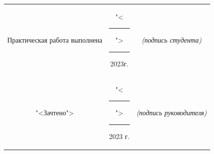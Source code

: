 \begin{titlepage}
\begin{center}
		\vfill

		\begin{footnotesize}
			\begin{tabular}{ccc}
				Практическая  работа выполнена
				& "<\rule{1ex}{.5pt}">\rule{7ex}{.5pt}2023г.
				& \textit{(подпись студента)}\\
				"<Зачтено"> 
				& "<\rule{1ex}{.5pt}">\rule{7ex}{.5pt}2023 г.
				& \textit{(подпись руководителя)}\\
			\end{tabular}
		\end{footnotesize}

		\vfill
	\end{center}
\end{titlepage}
\setcounter{page}{2}
\clearpage

